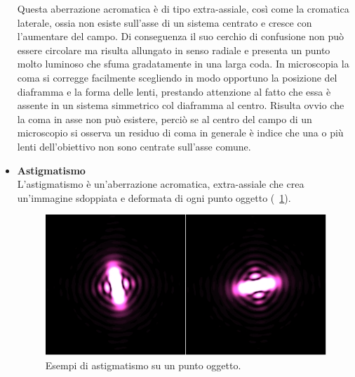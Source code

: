 \begin{itemize}
Questa aberrazione acromatica è di tipo extra-assiale, così come la cromatica laterale, ossia non esiste sull'asse di un sistema centrato e cresce con l'aumentare del campo. Di conseguenza il suo cerchio di confusione non può essere circolare ma risulta allungato in senso radiale e presenta un punto molto luminoso che sfuma gradatamente in una larga coda. 
In microscopia la coma si corregge facilmente scegliendo in modo opportuno la posizione del diaframma e la forma delle lenti, prestando attenzione al fatto che essa è assente in un sistema simmetrico col diaframma al centro.
Risulta ovvio che la coma in asse non può esistere, perciò se al centro del campo di un microscopio si osserva un residuo di coma in generale è indice che una o più lenti dell'obiettivo non sono centrate sull'asse comune.\\

\item \textbf{Astigmatismo}\\
L'astigmatismo è un'aberrazione acromatica, extra-assiale che crea un'immagine sdoppiata e deformata di ogni punto oggetto (\figurename~\ref{fig:astigmatismo}).\\

\begin{figure}[!ht]
 \centering
 \includegraphics[scale=.50]{img/CAP2astig.jpg}
 \caption{\small{Esempi di astigmatismo su un punto oggetto.}}
 \label{fig:astigmatismo}
\end{figure}


\end{itemize}
